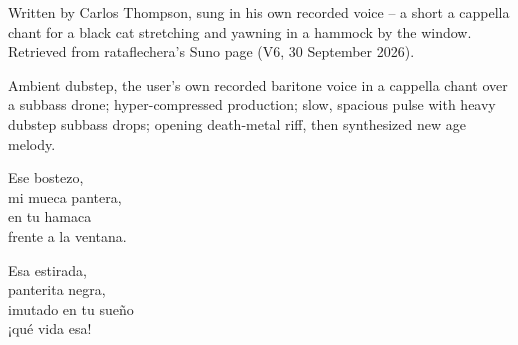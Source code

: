 
\begin{notes}
Written by Carlos Thompson, sung in his own recorded voice -- a short a cappella chant for a black cat stretching and yawning in a hammock by the window. Retrieved from rataflechera's Suno page (V6, 30 September 2026).
\end{notes}
\begin{style}
Ambient dubstep, the user's own recorded baritone voice in a cappella chant over a subbass drone; hyper-compressed production; slow, spacious pulse with heavy dubstep subbass drops; opening death-metal riff, then synthesized new age melody.
\end{style}
\begin{lyrics}

Ese bostezo,\\
mi mueca pantera,\\
en tu hamaca\\
frente a la ventana.

Esa estirada,\\
panterita negra,\\
imutado en tu sueño\\
¡qué vida esa!

\end{lyrics}

